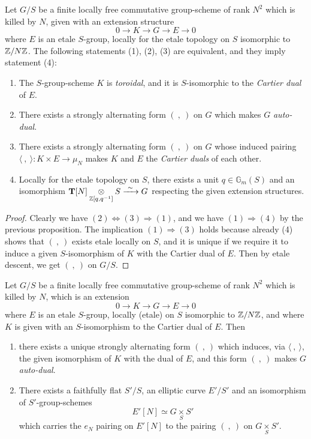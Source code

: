 \begin{kprop}\label{prop:8.10.6}
Let $G/S$ be a finite locally free commutative group-scheme of rank $N^2$ which is killed by $N$, given with an extension structure
\[
0 \to K \to G \to E \to 0
\]
where $E$ is an etale $S$-group, locally for the etale topology on $S$ isomorphic to $\mathbb{Z}/N\mathbb{Z}$. The following statements (1), (2), (3) are equivalent, and they imply statement (4):
\begin{enumerate}[(1)]
\item The $S$-group-scheme $K$ is \emph{toroidal}, and it is $S$-isomorphic to the \emph{Cartier dual} of $E$.
\item There exists a strongly alternating form $(\ ,\ )$ on $G$ which makes $G$ \emph{auto-dual}.
\item There exists a strongly alternating form $(\ ,\ )$ on $G$ whose induced pairing $\langle\ ,\ \rangle : K \times E \to \mu_N$ makes $K$ and $E$ the \emph{Cartier duals} of each other.
\item Locally for the etale topology on $S$, there exists a unit $q \in \mathbb{G}_m(S)$ and an isomorphism $\mathbf{T}[N] \underset{\mathbb{Z}[q,q^{-1}]}{\otimes} S \xrightarrow{\ \sim\ } G$ respecting the given extension structures.
\end{enumerate}
\end{kprop}

\begin{proof}
Clearly we have $(2) \Longleftrightarrow (3) \Longrightarrow (1)$, and we have $(1) \Longrightarrow (4)$ by the previous proposition. The implication $(1) \Longrightarrow (3)$ holds because already (4) shows that $(\ ,\ )$ exists etale locally on $S$, and it is unique if we require it to induce a given $S$-isomorphism of $K$ with the Cartier dual of $E$. Then by etale descent, we get $(\ ,\ )$ on $G/S$.
\end{proof}

\begin{kcor}\label{cor:8.10.7}
Let $G/S$ be a finite locally free commutative group-scheme of rank $N^2$ which is killed by $N$, which is an extension
\[
0 \to K \to G \to E \to 0
\]
where $E$ is an etale $S$-group, locally (etale) on $S$ isomorphic to $\mathbb{Z}/N\mathbb{Z}$, and where $K$ is given with an $S$-isomorphism to the Cartier dual of $E$. Then
\begin{enumerate}[(1)]
\item there exists a unique strongly alternating form $(\ ,\ )$ which induces, via $\langle\ ,\ \rangle$, the given isomorphism of $K$ with the dual of $E$, and this form $(\ ,\ )$ makes $G$ \emph{auto-dual}.
\item There exists a faithfully flat $S'/S$, an elliptic curve $E'/S'$ and an isomorphism of $S'$-group-schemes
\[
E'[N] \simeq G \underset{S}{\times} S'
\]
which carries the $e_N$ pairing on $E'[N]$ to the pairing $(\ ,\ )$ on $G \underset{S}{\times} S'$.
\end{enumerate}
\end{kcor}

